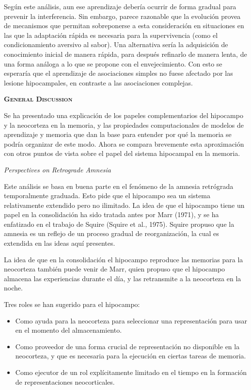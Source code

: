\documentclass[a4paper,12pt]{article}
\begin{document}
Según este análisis, aun ese aprendizaje debería ocurrir de forma gradual para prevenir la interferencia. Sin embargo, parece razonable que la evolución provea de mecanismos que permitan sobreponerse a esta consideración en situaciones en las que la adaptación rápida es necesaria para la supervivencia (como el condicionamiento aversivo al sabor). Una alternativa sería la adquisición de conocimiento inicial de manera rápida, para después refinarlo de manera lenta, de una forma análoga a lo que se propone con el envejecimiento. Con esto se esperaría que el aprendizaje de asociaciones simples no fuese afectado por las lesione hipocampales, en contraste a las asociaciones complejas. 

{\scshape\bfseries General Discussion}

Se ha presentado una explicación de los papeles complementarios del hipocampo y la neocorteza en la memoria, y las propiedades computacionales de modelos de aprendizaje y memoria que dan la base para entender por qué la memoria se podría organizar de este modo. Ahora se compara brevemente esta aproximación con otros puntos de vista sobre el papel del sistema hipocampal en la memoria.

{\itshape Perspectives on Retrograde Amnesia}

Este análisis se basa en buena parte en el fenómeno de la amnesia retrógrada temporalmente graduada. Esto pide que el hipocampo sea un sistema relativamente extendido pero no ilimitado. La idea de que el hipocampo tiene un papel en la consolidación ha sido tratada antes por Marr (1971), y se ha enfatizado en el trabajo de Squire (Squire et al., 1975). Squire propuso que la amnesia es un reflejo de un proceso gradual de reorganización, la cual es extendida en las ideas aquí presentes. 

La idea de que en la consolidación el hipocampo reproduce las memorias para la neocorteza también puede venir de Marr, quien propuso que el hipocampo almacena las experiencias durante el día, y las retransmite a la neocorteza en la noche. 

Tres roles se han sugerido para el hipocampo:
\begin{itemize}
	\item Como ayuda para la neocorteza para seleccionar una representación para usar en el momento del almacenamiento.
	\item Como proveedor de una forma crucial de representación no disponible en la neocorteza, y que es necesaria para la ejecución en ciertas tareas de memoria.
	\item Como ejecutor de un rol explícitamente limitado en el tiempo en la formación de representaciones neocorticales.
\end{itemize}
\end{document}
